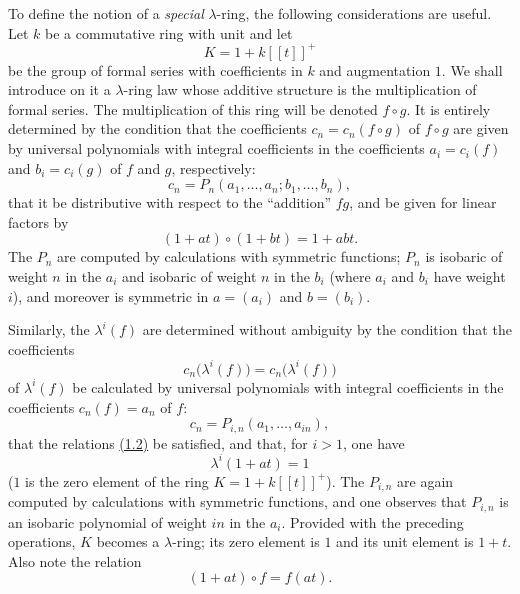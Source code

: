 To define the notion of a \emph{special} $\lambda$-ring, the following considerations are useful. Let $k$ be a commutative ring with unit and let
\[
K=1+k[[t]]^+
\]
be the group of formal series with coefficients in $k$ and augmentation $1$. We shall introduce on it a $\lambda$-ring law whose additive structure is the multiplication of formal series. The multiplication of this ring will be denoted $f\circ g$. It is entirely determined by the condition that the coefficients $c_n=c_n(f\circ g)$ of $f\circ g$ are given by universal polynomials with integral coefficients in the coefficients $a_i=c_i(f)$ and $b_i=c_i(g)$ of $f$ and $g$, respectively:
\begin{equation}\tag{1.6}
c_n=P_n(a_1,\ldots,a_n;b_1,\ldots,b_n),
\end{equation}
that it be distributive with respect to the ``addition'' $fg$, and be given for linear factors by
\begin{equation}\tag{1.7}
(1+at)\circ(1+bt)=1+abt.
\end{equation}
The $P_n$ are computed by calculations with symmetric functions; $P_n$ is isobaric of weight $n$ in the $a_i$ and isobaric of weight $n$ in the $b_i$ (where $a_i$ and $b_i$ have weight $i$), and moreover is symmetric in $a=(a_i)$ and $b=(b_i)$.

Similarly, the $\lambda^i(f)$ are determined without ambiguity by the condition that the coefficients
\[
c_n\bigl(\lambda^i(f)\bigr)=c_n\bigl(\lambda^i(f)\bigr)
\]
of $\lambda^i(f)$ be calculated by universal polynomials with integral coefficients in the coefficients $c_n(f)=a_n$ of $f$:
\begin{equation}\tag{1.8}
c_n=P_{i,n}(a_1,\ldots,a_{in}),
\end{equation}
that the relations \hyperlink{sga6.e00.eq.1-2.occ2}{(1.2)} be satisfied, and that, for $i>1$, one have
\begin{equation}\tag{1.9}
\lambda^i(1+at)=1
\end{equation}
($1$ is the zero element of the ring $K=1+k[[t]]^+$). The $P_{i,n}$ are again computed by calculations with symmetric functions, and one observes that $P_{i,n}$ is an isobaric polynomial of weight $in$ in the $a_i$. Provided with the preceding operations, $K$ becomes a $\lambda$-ring; its zero element is $1$ and its unit element is $1+t$. Also note the relation
\begin{equation}\tag{1.7 bis}
(1+at)\circ f=f(at).
\end{equation}

